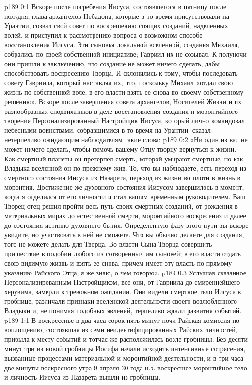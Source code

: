 \vs p189 0:1 Вскоре после погребения Иисуса, состоявшегося в пятницу после полудня, глава архангелов Небадона, которые в то время присутствовали на Урантии, созвал свой совет по воскрешению спящих созданий, наделенных волей, и приступил к рассмотрению вопроса о возможном способе воcстановления Иисуса. Эти сыновья локальной вселенной, создания Михаила, собрались по своей собственной инициативе; Гавриил их не созывал. К полуночи они пришли к заключению, что создание не может ничего сделать, дабы способствовать воскресению Творца. И склонились к тому, чтобы последовать совету Гавриила, который наставлял их, что, поскольку Михаил «отдал свою жизнь по собственной воле, в его власти взять ее снова по своему собственному решению». Вскоре после завершения совета архангелов, Носителей Жизни и их разнообразных сподвижников в деле восстановления создания и моронтийного творения Персонализированный Настройщик Иисуса, который лично командовал небесными воинствами, собравшимися в то время на Урантии, сказал нетерпеливо ожидающим наблюдателям такие слова:
\vs p189 0:2 «Ни один из вас не может ничего сделать, чтобы помочь вашему Отцу\hyp{}творцу вернуться к жизни. Как смертный планеты он претерпел смерть, которой умирают смертные, но как Владыка вселенной он по\hyp{}прежнему жив. То, что вы наблюдаете, есть переход из смертного состояния Иисуса из Назарета, переход из жизни во плоти в жизнь в моронтии. Достижение же духовного состояния Иисусом завершилось в момент, когда я отделился от его личности и стал вашим временным руководителем. Ваш Творец\hyp{}отец решил пройти весь путь своих смертных созданий, от рождения в материальных мирах до естественной смерти, моронтийного воскресения и далее до состояния истинно духовного бытия. Определенную фазу этого пути вы вскоре увидите, но участвовать в ней не сможете. Что вы обычно делаете для создания, того не можете делать для Творца. Во власти Сына\hyp{}Творца совершить пришествие в подобии любого из сотворенных им сыновей; в его власти отдать свою видимую жизнь и взять ее снова, причем имеет эту власть по прямому указанию Райского Отца; я же знаю, о чем говорю».
\vs p189 0:3 Услышав сказанное Персонализированным Настройщиком, все они, от Гавриила до смиреннейшего херувима, замерли в тревожном ожидании. Они видели смертное тело Иисуса в гробнице, различали признаки вселенской деятельности своего возлюбленного Владыки и, не понимая подобных явлений, терпеливо ждали развития событий.
\vs p189 1:1 В воскресенье в два часа сорок пять минут ночи Райская комиссия по воплощению, состоявшая из семи неидентифицированных Райских личностей, прибыла к месту событий и тотчас же расположилась возле гробницы. Без десяти минут три из новой гробницы Иосифа начали исходить интенсивные сотрясения, вызванные процессами материальной и моронтийной деятельности, и в три часа две минуты воскресного утра 9 апреля 30 года н.э. воскресшее моронтийное тело и личность Иисуса из Назарета вышли из гробницы.
